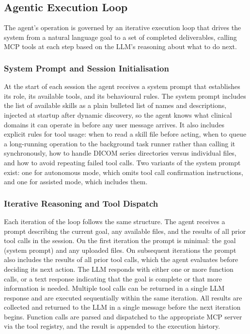 \documentclass[conference]{IEEEtran}
\begin{document}


\subsection{Agentic Execution Loop}

The agent's operation is governed by an iterative execution loop that drives the system from a natural language goal to a set of completed deliverables, calling MCP tools at each step based on the LLM's reasoning about what to do next.

\subsubsection{System Prompt and Session Initialisation}

At the start of each session the agent receives a system prompt that establishes its role, its available tools, and its behavioural rules. The system prompt includes the list of available skills as a plain bulleted list of names and descriptions, injected at startup after dynamic discovery, so the agent knows what clinical domains it can operate in before any user message arrives.
It also includes explicit rules for tool usage: when to read a skill file before acting, when to queue a long-running operation to the background task runner rather than calling it synchronously, how to handle DICOM series directories versus individual files, and how to avoid repeating failed tool calls.
Two variants of the system prompt exist: one for autonomous mode, which omits tool call confirmation instructions, and one for assisted mode, which includes them.

\subsubsection{Iterative Reasoning and Tool Dispatch}

Each iteration of the loop follows the same structure. The agent receives a prompt describing the current goal, any available files, and the results of all prior tool calls in the session.
On the first iteration the prompt is minimal: the goal (system prompt) and any uploaded files.
On subsequent iterations the prompt also includes the results of all prior tool calls, which the agent evaluates before deciding its next action. The LLM responds with either one or more function calls, or a text response indicating that the goal is complete or that more information is needed. Multiple tool calls can be returned in a single LLM response and are executed sequentially within the same iteration. All results are collected and returned to the LLM in a single message before the next iteration begins. Function calls are parsed and dispatched to the appropriate MCP server via the tool registry, and the result is appended to the execution history.
\end{document}
